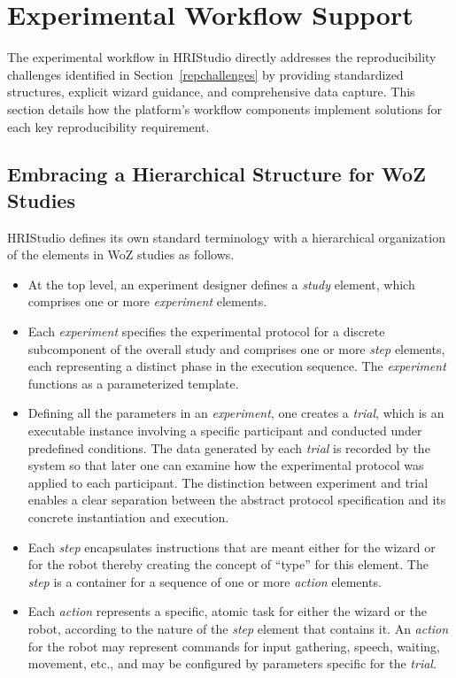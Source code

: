 \documentclass[letterpaper, 10 pt, conference]{subfiles/ieeeconf}
\begin{document}
\section{Experimental Workflow Support}
\label{workflow}

The experimental workflow in HRIStudio directly addresses the reproducibility challenges identified in Section~\ref{repchallenges} by providing standardized structures, explicit wizard guidance, and comprehensive data capture. This section details how the platform's workflow components implement solutions for each key reproducibility requirement.

\subsection{Embracing a Hierarchical Structure for WoZ Studies}

HRIStudio defines its own standard terminology with a hierarchical organization of the elements in WoZ studies as follows.
\begin{itemize}
\item At the top level, an experiment designer defines a \emph{study} element, which comprises one or more \emph{experiment} elements. 

\item Each \emph{experiment} specifies the experimental protocol for a discrete subcomponent of the overall study and comprises one or more \emph{step} elements, each representing a distinct phase in the execution sequence. The \emph{experiment} functions as a parameterized template.

\item Defining all the parameters in an \emph{experiment}, one creates a \emph{trial}, which is an executable instance involving a specific participant and conducted under predefined conditions. The data generated by each \emph{trial} is recorded by the system so that later one can examine how the experimental protocol was applied to each participant. The distinction between experiment and trial enables a clear separation between the abstract protocol specification and its concrete instantiation and execution.

\item Each \emph{step} encapsulates instructions that are meant either for the wizard or for the robot thereby creating the concept of ``type'' for this element. The \emph{step} is a container for a sequence of one or more  \emph{action} elements. 

\item Each \emph{action} represents a specific, atomic task for either the wizard or the robot, according to the nature of the \emph{step} element that contains it. An \emph{action} for the robot may represent commands for input gathering, speech, waiting, movement, etc., and may be configured by parameters specific for the \emph{trial}.
\end{itemize}
\end{document}
